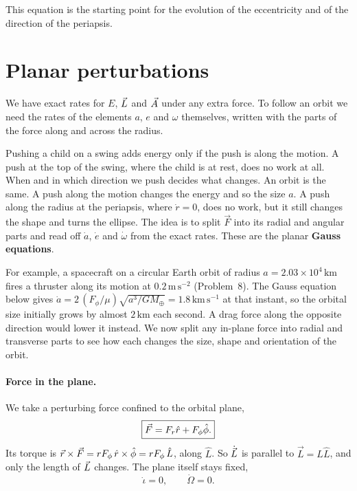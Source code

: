 	This equation is the starting point for the evolution of the eccentricity and of the direction of the periapsis.
	
	\section{Planar perturbations}
	\label{tb:sec:planar_pert}
	
	We have exact rates for $E$, $\vec L$ and $\vec A$ under any extra force. 	To follow an orbit we need the rates of the elements $a$, $e$ and $\omega$ themselves, written with the parts of the force along and across the radius.

	Pushing a child on a swing adds energy only if the push is along the motion. A push at the top of the swing, where the child is at rest, does no work at all. When and in which direction we push decides what changes. 	An orbit is the same. A push along the motion changes the energy and so the size $a$. A push along the radius at the periapsis, where $\dot r=0$, does no work, but it still changes the shape and turns the ellipse. The idea is to split $\vec F$ into its radial and angular parts and read off $\dot a$, $\dot e$ and $\dot\omega$ from the exact rates. These are the planar \textbf{Gauss equations}.

	For example, a spacecraft on a circular Earth orbit of radius $a=2.03\times10^{4}\,\mathrm{km}$ fires a thruster along its motion at $0.2\,\mathrm{m\,s^{-2}}$ (Problem~8). The Gauss equation below gives $\dot a=2\,(F_\phi/\mu)\sqrt{a^3/GM_\oplus}=1.8\,\mathrm{km\,s^{-1}}$ at that instant, so the orbital size initially grows by almost $2\,\mathrm{km}$ each second. A drag force along the opposite direction would lower it instead. We now split any in-plane force into radial and transverse parts to see how each changes the size, shape and orientation of the orbit.

	\paragraph{Force in the plane.} We take a perturbing force confined to the orbital plane,
	\begin{equation}
		\boxed{
			\vec F
			=
			F_r\hat r+F_{\phi}\hat\phi .
		}
		\label{eq:planar_force}
	\end{equation}
	Its torque is $\vec r\times\vec F=rF_\phi\,\hat r\times\hat\phi=rF_\phi\,\hat L$, along $\hat L$. So $\dot{\vec L}$ is parallel to $\vec L=L\hat L$, and only the length of $\vec L$ changes. The plane itself stays fixed,
	\begin{equation}
		\boxed{
			\dot\iota=0,
			\qquad
			\dot\Omega=0.
		}
		\label{eq:planar_plane_fixed}
	\end{equation}
	
